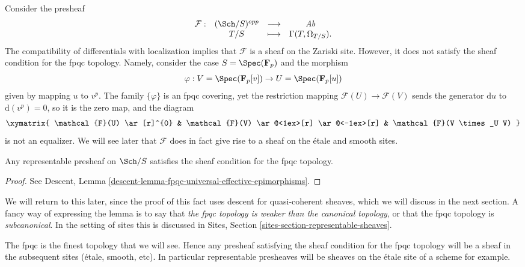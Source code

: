 \begin{example}
\label{example-quasi-coherent}
Consider the presheaf
$$
\begin{matrix}
\mathcal{F} : & (\Sch/S)^{opp} & \longrightarrow & \textit{Ab} \\
& T/S & \longmapsto & \Gamma(T, \Omega_{T/S}).
\end{matrix}
$$
The compatibility of differentials with localization implies that
$\mathcal{F}$ is a sheaf on the Zariski site.
However, it does not satisfy the sheaf condition for the fpqc topology.
Namely, consider the case
$S = \Spec(\mathbf{F}_p)$ and the morphism
$$
\varphi :
V = \Spec(\mathbf{F}_p[v])
\to
U = \Spec(\mathbf{F}_p[u])
$$
given by mapping $u$ to $v^p$. The family $\{\varphi\}$ is an fpqc covering,
yet the restriction mapping
$\mathcal{F}(U) \to \mathcal{F}(V)$
sends the generator $\mathrm{d} u$ to $\mathrm{d}(v^p)
= 0$, so it is the zero map, and the diagram
$$
\xymatrix{
\mathcal{F}(U) \ar[r]^{0} &
\mathcal{F}(V) \ar@<1ex>[r] \ar@<-1ex>[r] &
\mathcal{F}(V \times_U V)
}
$$
is not an equalizer. We will see later that $\mathcal{F}$ does in fact
give rise to a sheaf on the \'etale and smooth sites.
\end{example}

\begin{lemma}
\label{lemma-representable-sheaf-fpqc}
Any representable presheaf on $\Sch/S$ satisfies the
sheaf condition for the fpqc topology.
\end{lemma}

\begin{proof}
See
Descent, Lemma \ref{descent-lemma-fpqc-universal-effective-epimorphisms}.
\end{proof}

\noindent
We will return to this later, since the proof of this fact uses
descent for quasi-coherent sheaves, which we will discuss in the next
section. A fancy way of expressing the lemma is to say that
{\it the fpqc topology is weaker than the canonical topology}, or
that the fpqc topology is {\it subcanonical}. In the setting of sites
this is discussed in
Sites, Section \ref{sites-section-representable-sheaves}.

\begin{remark}
\label{remark-fpqc-finest}
The fpqc is the finest topology that we will see. Hence any presheaf
satisfying the sheaf condition for the fpqc topology will be a
sheaf in the subsequent sites (\'etale, smooth, etc). In particular
representable presheaves will be sheaves on the \'etale site of a scheme
for example.
\end{remark}

